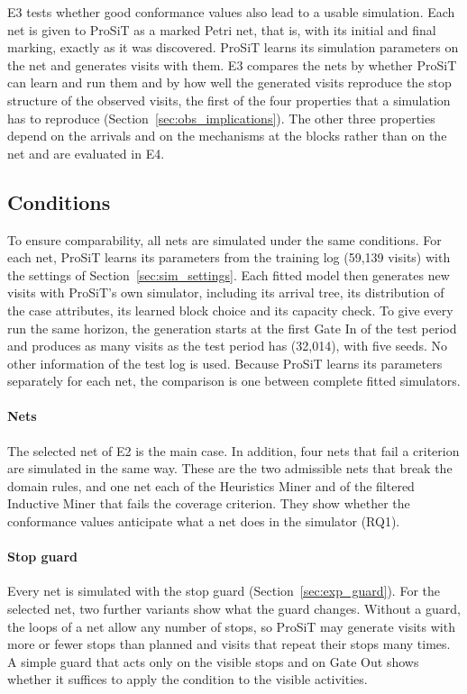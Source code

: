E3 tests whether good conformance values also lead to a usable simulation. Each
net is given to ProSiT as a marked Petri net, that is, with its initial and final
marking, exactly as it was discovered. ProSiT learns its simulation parameters on
the net and generates visits with them. E3 compares the nets by whether ProSiT can
learn and run them and by how well the generated visits reproduce the stop
structure of the observed visits, the first of the four properties that a
simulation has to reproduce (Section~\ref{sec:obs_implications}). The other three
properties depend on the arrivals and on the mechanisms at the blocks rather than
on the net and are evaluated in E4.

\subsection{Conditions}
\label{sec:exp_e3_conditions}
\label{sec:mc_hyperparameters}
\label{sec:mc_ctb_adaptations}

To ensure comparability, all nets are simulated under the same conditions. For each
net, ProSiT learns its parameters from the training log (59,139 visits) with the
settings of Section~\ref{sec:sim_settings}. Each fitted model then generates new
visits with ProSiT's own simulator, including its arrival tree, its distribution of
the case attributes, its learned block choice and its capacity check. To give every
run the same horizon, the generation starts at the first Gate In of the test period
and produces as many visits as the test period has (32,014), with five seeds. No
other information of the test log is used. Because ProSiT learns its parameters
separately for each net, the comparison is one between complete fitted simulators.

\paragraph{Nets} The selected net of E2 is the main case. In addition, four nets
that fail a criterion are simulated in the same way. These are the two admissible
nets that break the domain rules, and one net each of the Heuristics Miner and of
the filtered Inductive Miner that fails the coverage criterion. They show whether
the conformance values anticipate what a net does in the simulator (RQ1).

\paragraph{Stop guard} Every net is simulated with the stop guard
(Section~\ref{sec:exp_guard}). For the selected net, two further variants show what
the guard changes. Without a guard, the loops of a net allow any number of stops,
so ProSiT may generate visits with more or fewer stops than planned and visits that
repeat their stops many times. A simple guard that acts only on the visible stops
and on Gate Out shows whether it suffices to apply the condition to the visible
activities.


